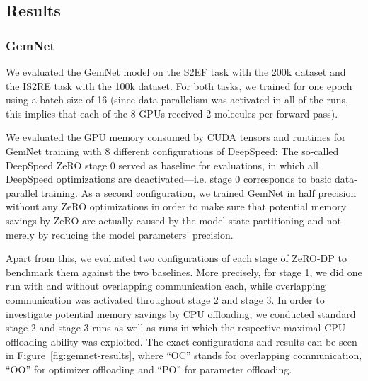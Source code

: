 \subsection{Results}

\subsubsection{GemNet}

We evaluated the GemNet model on the S2EF task with the 200k dataset and
the IS2RE task with the 100k dataset. For both tasks, we trained for one epoch
using a batch size of 16 (since data parallelism was activated in all of the 
runs, this implies that each of the 8 GPUs received 2 molecules per forward pass). 

We evaluated the GPU memory consumed by CUDA tensors and runtimes for GemNet training with 8 different 
configurations of DeepSpeed:
The so-called DeepSpeed ZeRO stage 0 served as baseline for evaluations, in which 
all DeepSpeed optimizations are deactivated---i.e. stage 0 corresponds to basic 
data-parallel training. As a second configuration, we trained GemNet 
in half precision without any ZeRO optimizations in order to make sure that
potential memory savings by ZeRO are actually caused by the model state partitioning and
not merely by reducing the model parameters' precision.

Apart from this, we evaluated two configurations of each stage of ZeRO-DP to benchmark 
them against the two baselines. More precisely, for stage 1, we did one run with and 
without overlapping communication each, while overlapping communication
was activated throughout stage 2 and stage 3. In order to investigate potential 
memory savings by CPU offloading, we conducted standard stage 2 and stage 3 runs as well
as runs in which the respective maximal CPU offloading ability was exploited.
The exact configurations and results can be seen in Figure~\ref{fig:gemnet-results}, 
where \enquote{OC} stands for overlapping communication,
\enquote{OO} for optimizer offloading and \enquote{PO} for parameter offloading.

